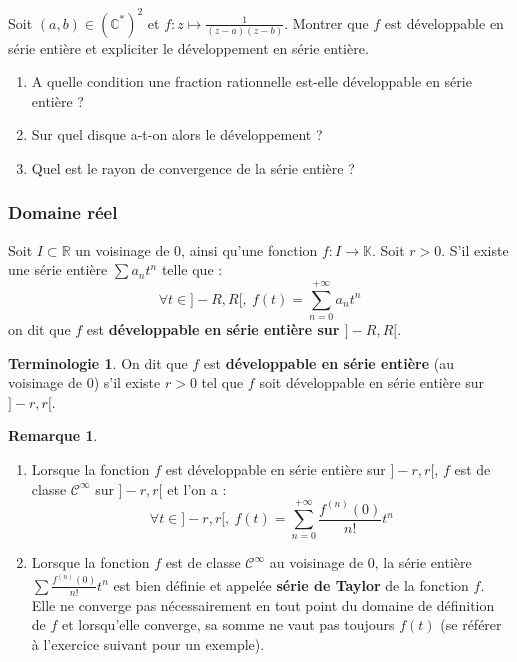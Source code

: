 \documentclass[french]{article}
\newcommand{\R}{\mathbb{R}}
\newcommand{\C}{\mathbb{C}}
\newcommand{\K}{\mathbb{K}}
\newcommand{\st}{^*}
\theoremstyle{plain}
\theoremstyle{definition}
\newtheorem*{rmq}{Remarque}
\newtheorem*{terminologie}{Terminologie}
\theoremstyle{remark}
\begin{document}
\begin{exo}
	Soit $(a,b)\in(\C\st)^2$ et $f:z\mapsto\displaystyle\frac{1}{(z-a)(z-b)}$. Montrer que $f$ est développable en série entière et expliciter le développement en série entière.
\end{exo}

\begin{exo}
	\begin{enumerate}
		\item A quelle condition une fraction rationnelle est-elle développable en série entière ?
		\item Sur quel disque a-t-on alors le développement ?
		\item Quel est le rayon de convergence de la série entière ?
	\end{enumerate}
\end{exo}

\subsubsection*{Domaine réel}

\begin{dfn}
	Soit $I\subset\R$ un voisinage de $0$, ainsi qu'une fonction $f:I\to\K$. Soit $r>0$. S'il existe une série entière $\displaystyle\sum a_nt^n$ telle que : $$\forall t\in]-R,R[,\ f(t)=\sum_{n=0}^{+\infty}a_nt^n$$ on dit que $f$ est \textbf{développable en série entière sur $]-R,R[$}.
\end{dfn}

\begin{terminologie}
	On dit que $f$ est \textbf{développable en série entière} (au voisinage de $0$) s'il existe $r>0$ tel que $f$ soit développable en série entière sur $]-r,r[$.
\end{terminologie}

\begin{rmq}%
	\begin{enumerate}
		\item Lorsque la fonction $f$ est développable en série entière sur $]-r,r[$, $f$ est de classe $\mathcal{C}^\infty$ sur $]-r,r[$ et l'on a : $$\forall t\in]-r,r[,\ f(t)=\sum_{n=0}^{+\infty}\frac{f^{(n)}(0)}{n!}t^n$$
		\item Lorsque la fonction $f$ est de classe $\mathcal{C}^\infty$ au voisinage de $0$, la série entière $\displaystyle\sum\frac{f^{(n)}(0)}{n!}t^n$ est bien définie et appelée \textbf{série de Taylor} de la fonction $f$. Elle ne converge pas nécessairement en tout point du domaine de définition de $f$ et lorsqu'elle converge, sa somme ne vaut pas toujours $f(t)$ (se référer à l'exercice suivant pour un exemple).
	\end{enumerate}	
\end{rmq}
\end{document}
